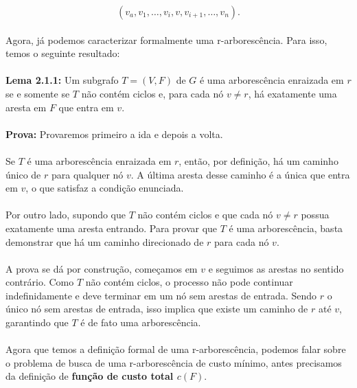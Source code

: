 \documentclass[12pt,a4paper]{article}
\begin{document}
\[
(v_a, v_1, \ldots, v_i, v, v_{i+1}, \ldots, v_n).
\]

\paragraph{}
Agora, já podemos caracterizar formalmente uma r-arborescência. Para isso, temos o seguinte resultado:

\paragraph{}
\textbf{Lema 2.1.1:} Um subgrafo \(T = (V, F)\) de \(G\) é uma arborescência enraizada em \(r\) se e somente se \(T\) não contém ciclos e, para cada nó \(v \neq r\), há exatamente uma aresta em \(F\) que entra em \(v\).

\paragraph{}
\textbf{Prova:} Provaremos primeiro a ida e depois a volta.

\paragraph{}
Se \(T\) é uma arborescência enraizada em \(r\), então, por definição, há um caminho único de \(r\) para qualquer nó \(v\). A última aresta desse caminho é a única que entra em \(v\), o que satisfaz a condição enunciada.

\paragraph{}
Por outro lado, supondo que \(T\) não contém ciclos e que cada nó \(v \neq r\) possua exatamente uma aresta entrando. Para provar que \(T\) é uma arborescência, basta demonstrar que há um caminho direcionado de \(r\) para cada nó \(v\). 

\paragraph{}
A prova se dá por construção, começamos em \(v\) e seguimos as arestas no sentido contrário. Como \(T\) não contém ciclos, o processo não pode continuar indefinidamente e deve terminar em um nó sem arestas de entrada. Sendo \(r\) o único nó sem arestas de entrada, isso implica que existe um caminho de \(r\) até \(v\), garantindo que \(T\) é de fato uma arborescência.

\paragraph{}
Agora que temos a definição formal de uma r-arborescência, podemos falar sobre o problema de busca de uma r-arborescência de custo mínimo, antes precisamos da definição de \textbf{função de custo total \(c(F)\)}.
\end{document}
